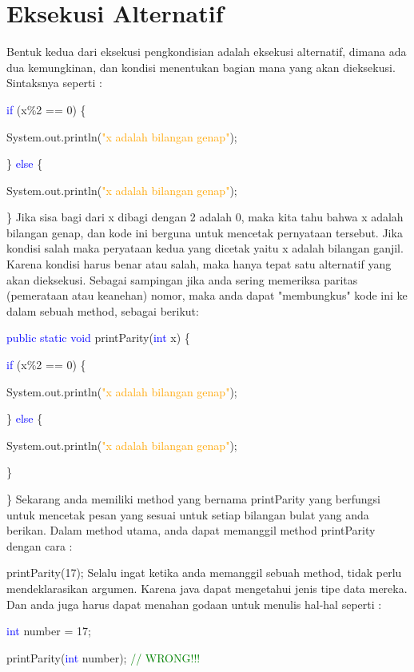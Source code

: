 \section{Eksekusi Alternatif}
Bentuk kedua dari eksekusi pengkondisian adalah eksekusi alternatif, dimana ada dua kemungkinan, dan kondisi menentukan bagian mana yang akan dieksekusi. Sintaksnya seperti :
\par
\textcolor{blue}{if} (x\%2 == 0) \{
\par
System.out.println(\textcolor{orange}{"x adalah bilangan genap"});
\par
\} \textcolor{blue}{else} \{
\par
System.out.println(\textcolor{orange}{"x adalah bilangan genap"});
\par
\}
\newline
Jika sisa bagi dari x dibagi dengan 2 adalah 0, maka kita tahu bahwa x adalah bilangan genap, dan kode ini berguna untuk mencetak pernyataan tersebut. Jika kondisi salah maka peryataan kedua yang dicetak yaitu x adalah bilangan ganjil. Karena kondisi harus benar atau salah, maka hanya tepat satu alternatif yang akan dieksekusi.
\newline
Sebagai sampingan jika anda sering memeriksa paritas (pemerataan atau keanehan) nomor, maka anda dapat "membungkus" kode ini ke dalam sebuah method, sebagai berikut:
\par
\textcolor{blue}{public static void} printParity(\textcolor{blue}{int} x) \{
\par
\textcolor{blue}{if} (x\%2 == 0) \{
\par
System.out.println(\textcolor{orange}{"x adalah bilangan genap"});
\par
\} \textcolor{blue}{else} \{
\par
System.out.println(\textcolor{orange}{"x adalah bilangan genap"});
\par
\}
\par
\}
\newline
Sekarang anda memiliki method yang bernama printParity yang berfungsi untuk mencetak pesan yang sesuai untuk setiap bilangan bulat yang anda berikan. Dalam method utama, anda dapat memanggil method printParity dengan cara :
\newline
\par
printParity(17);
\newline
\newline
Selalu ingat ketika anda memanggil sebuah method, tidak perlu mendeklarasikan argumen. Karena java dapat mengetahui jenis tipe data mereka. Dan anda juga harus dapat menahan godaan untuk menulis hal-hal seperti :
\par
\textcolor{blue}{int} number = 17;
\par
printParity(\textcolor{blue}{int} number); \textcolor{green}{// WRONG!!!}
